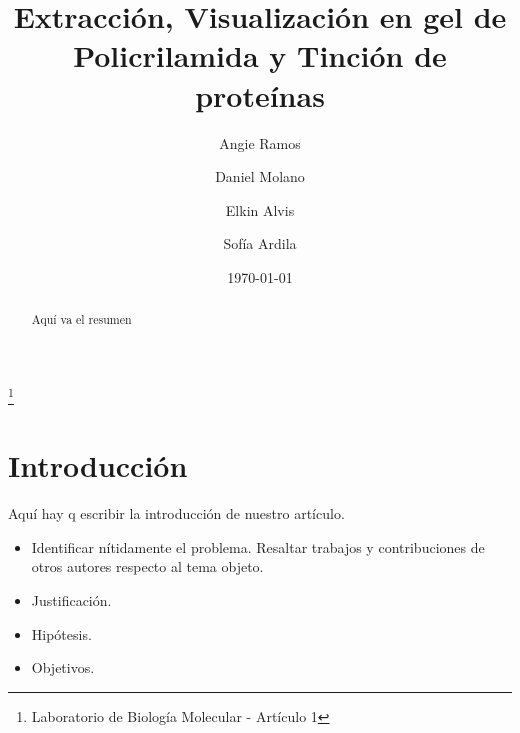 \documentclass[%
 reprint,
 amsmath,amssymb,
 aps,
showkeys
]{revtex4-1}
\begin{document}

\title{Extracción, Visualización en gel de Policrilamida y Tinción de proteínas}%
\thanks{Laboratorio de Biología Molecular - Artículo 1}%

\author{Angie Ramos}
\author{Daniel Molano}%
\author{Elkin Alvis}
\author{Sof\'ia Ardila}

%


\date[Fecha: ]{\today}%

\begin{abstract}
Aquí va el resumen
\end{abstract}

\maketitle


\section{\label{sec:Intro}Introducción}
	Aquí hay q escribir la introducción de nuestro artículo\citep{Alfonso2010a}. \\
	
	\begin{itemize}
		\item Identificar nítidamente el problema.
		\subitem Resaltar trabajos y contribuciones de otros autores respecto al tema objeto.
		\item Justificación.
		\item Hipótesis. 
		\item Objetivos.
	\end{itemize}
	
\end{document}
